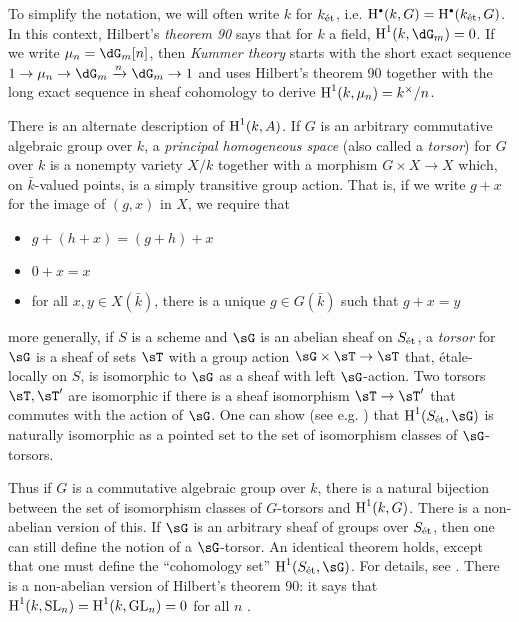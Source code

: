 To simplify the notation, we will often write $k$ for ${k}_\textnormal{\'et}$, i.e. 
$\h^\bullet(k,G) = \h^\bullet(\et k,G)$. In this context, Hilbert's 
\emph{theorem 90} says that for $k$ a field, $\h^1(k,\dG_m) = 0$. If we write 
$\mu_n = \dG_m[n]$, then \emph{Kummer theory} starts with the short exact 
sequence $1\to \mu_n\to \dG_m\xrightarrow n \dG_m \to 1$ and uses Hilbert's 
theorem 90 together with the long exact sequence in sheaf cohomology to derive 
$\operatorname{H}^1(k,\mu_n) = k^\times / n$. 

There is an alternate description of $\operatorname{H}^1(k,A)$. If $G$ is an arbitrary 
commutative algebraic group over $k$, a \emph{principal homogeneous space} 
(also called a \emph{torsor}) for $G$ over $k$ is a nonempty variety $X/k$ 
together with a morphism $G\times X\to X$ which, on $\bar k$-valued points, is 
a simply transitive group action. That is, if we write $g+x$ for the 
image of $(g,x)$ in $X$, we require that 
\begin{itemize}
  \item $g+(h+x) = (g+h)+x$ 
  \item $0+x = x$
  \item for all $x,y\in X(\bar k)$, there is a unique $g\in G(\bar k)$ such 
    that $g+x = y$
\end{itemize}
more generally, if $S$ is a scheme and $\sG$ is an abelian sheaf on ${S}_\textnormal{\'et}$, a 
\emph{torsor} for $\sG$ is a sheaf of sets $\sT$ with a group action 
$\sG\times \sT\to\sT$ that, \'etale-locally on $S$, is isomorphic to $\sG$ as 
a sheaf with left $\sG$-action. Two torsors $\sT,\sT'$ are isomorphic if there 
is a sheaf isomorphism $\sT\to \sT'$ that commutes with the action of $\sG$. 
One can show (see e.g. \cite[IV 1.1]{de77}) that $\h^1(\et S,\sG)$ is 
naturally isomorphic as a pointed set to the set of isomorphism classes of 
$\sG$-torsors. 

Thus if $G$ is a commutative algebraic group over $k$, there is a natural 
bijection between the set of isomorphism classes of $G$-torsors and 
$\operatorname{H}^1(k,G)$. There is a non-abelian version of this. If $\sG$ is an arbitrary 
sheaf of groups over ${S}_\textnormal{\'et}$, then one can still define the notion of a 
$\sG$-torsor. An identical theorem holds, except that one must define the 
``cohomology set'' $\h^1(\et S,\sG)$. For details, see \cite{sk01}. There is a 
non-abelian version of Hilbert's theorem 90: it says that 
$\operatorname{H}^1(k,\text{SL}_n) = \operatorname{H}^1(k,\text{GL}_n) = 0$ for all $n$ \cite[X 1]{se79}. 










